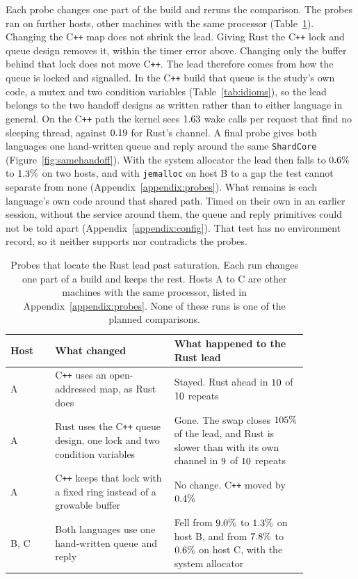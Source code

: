 \documentclass[english,oneside,a4paper,censored,csm,software-track-2020]{HYthesisML}
\begin{document}
Each probe changes one part of the build and reruns the comparison. The
probes ran on further hosts, other machines with the same processor
(Table~\ref{tab:probes}). Changing the C\texttt{++} map does
not shrink the lead. Giving Rust the C\texttt{++} lock and queue design
removes it, within the timer error above. Changing only the buffer behind that
lock does not move C\texttt{++}. The lead therefore comes from how the queue is
locked and signalled. In the C\texttt{++} build that queue is the study's own
code, a mutex and two condition variables (Table~\ref{tab:idioms}), so the lead
belongs to the two handoff designs as written rather than to either language in
general. On the C\texttt{++} path the kernel sees $1.63$
wake calls per request that find no sleeping thread, against
$0.19$ for Rust's channel. A final probe gives both
languages one hand-written queue and reply around the same
\texttt{ShardCore} (Figure~\ref{fig:samehandoff}). With the system allocator the lead
then falls to $0.6\%$ to $1.3\%$ on two hosts, and with
\texttt{jemalloc} on host B to a gap the test cannot separate from none
(Appendix~\ref{appendix:probes}). What remains is each language's own code around that
shared path. Timed on their own in an earlier session, without the service around them,
the queue and reply primitives could not be told apart (Appendix~\ref{appendix:config}). That test has no
environment record, so it neither supports nor contradicts the probes.

\begin{table}[!ht]
\centering
\small
\caption[Probes that locate the lead past saturation]{Probes that locate the
Rust lead past saturation. Each run changes one part of a
build and keeps the rest. Hosts A to C are other machines with the same
processor, listed in Appendix~\ref{appendix:probes}. None of these runs is
one of the planned comparisons.\label{tab:probes}}
\renewcommand{\arraystretch}{1.2}
\setlength{\tabcolsep}{6pt}
\begin{tabular}{@{}l>{\raggedright\arraybackslash}p{0.4\linewidth}%
>{\raggedright\arraybackslash}p{0.45\linewidth}@{}}
\hline\hline
Host & What changed & What happened to the Rust lead \\
\hline
A & C\texttt{++} uses an open-addressed map, as Rust does &
Stayed. Rust ahead in $10$ of $10$ repeats \\
A & Rust uses the C\texttt{++} queue design, one lock and two condition
variables & Gone. The swap closes $105\%$ of the lead, and Rust is slower
than with its own channel in $9$ of $10$ repeats \\
A & C\texttt{++} keeps that lock with a fixed ring instead of a growable
buffer & No change. C\texttt{++} moved by $0.4\%$ \\
B, C & Both languages use one hand-written queue and reply &
Fell from $9.0\%$ to $1.3\%$ on host B,
and from $7.8\%$ to $0.6\%$ on
host C, with the system allocator \\
\hline
\end{tabular}
\end{table}
\end{document}
